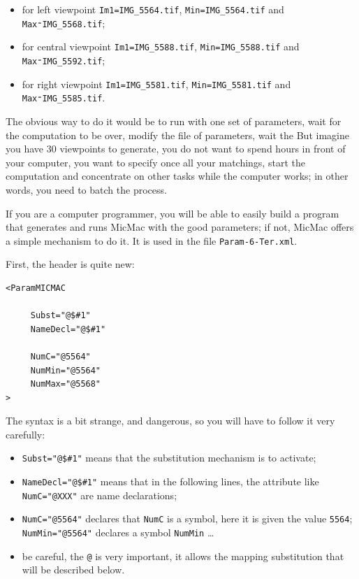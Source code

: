 \begin{itemize}
   \item  for left viewpoint {\tt Im1=IMG\_5564.tif}, {\tt Min=IMG\_5564.tif} and {\tt Max⁼IMG\_5568.tif};
   \item  for central viewpoint {\tt Im1=IMG\_5588.tif}, {\tt Min=IMG\_5588.tif} and {\tt Max⁼IMG\_5592.tif};
   \item  for right viewpoint {\tt Im1=IMG\_5581.tif}, {\tt Min=IMG\_5581.tif} and {\tt Max⁼IMG\_5585.tif}.
\end{itemize}


The obvious way to do it would be to run with one set of parameters, wait for the computation to be over,
modify the file of parameters, wait the \UNCLEAR{\dots} %
But imagine you have $30$ viewpoints to generate,
you do not want to spend hours in front of your computer, you want to specify once all your
matchings, start the computation and concentrate on other tasks while the computer works;
in other words, you need to batch the process.

If you are a computer programmer, you will be able to
easily build a program that generates and runs MicMac with the good parameters; if
not, MicMac offers a simple mechanism to do it. It is used
in the file {\tt Param-6-Ter.xml}.

First, the header is quite new:

{\scriptsize
\begin{verbatim}
<ParamMICMAC

     Subst="@$#1"
     NameDecl="@$#1"

     NumC="@5564"
     NumMin="@5564"
     NumMax="@5568"
>
\end{verbatim}
}

The syntax is a bit strange, and dangerous, so you will have to follow it
very carefully:

\begin{itemize}
   \item  {\tt Subst="@\$\#1"}  means that the substitution mechanism is to activate;

   \item  {\tt  NameDecl="@\$\#1"}  means that in the following lines, the attribute
         like {\tt NumC="@XXX"} are name declarations;

   \item  {\tt  NumC="@5564"}  declares that {\tt NumC} is a symbol, here  it is given the
          value {\tt 5564};  {\tt NumMin="@5564"} declares a symbol {\tt NumMin} \dots

   \item  be careful, the {\tt @} is very important, it allows the mapping substitution
          that will be described below.
\end{itemize}


